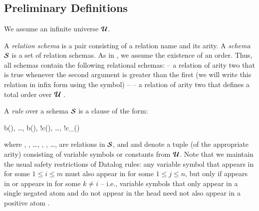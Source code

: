 \section{\large \bf \lang}
\label{sec:foundation}

\subsection{Preliminary Definitions}


We assume an infinite universe $\univ$.

A {\em relation schema} is a pair consisting of a relation name and its arity.
A {\em schema} $\schema$ is a set of relation schemas.   As in , we assume the existence of an order.  Thus, all schemas contain the following relational schemas:  -- a relation of arity two that is true whenever the second argument is greater than the first (we will write this relation in infix form using the \dedalus{<} symbol) --  -- a relation of arity two that defines a total order over $\univ$ .

A {\em rule} over a schema $\schema$ is a clause of the form:

\begin{Drules}
        {b(), \ldots, b(), !c(), \ldots, !c\_()}
\end{Drules}

where , , \ldots, ,
, \ldots,  are relations in
$\schema$, and  and 
denote a tuple (of the appropriate arity) consisting of variable symbols or
constants from $\univ$.  Note that we maintain the usual safety
restrictions of Datalog rules: any variable symbol  that appears in
 for some $1 \leq i \leq m$ must also appear in
 for some $1 \leq j \leq n$, but only if 
appears in  or  appears in
 for some $k \neq i$ -- i.e., variable symbols that
only appear in a single negated atom and do not appear in the head need not also
appear in a positive atom .


